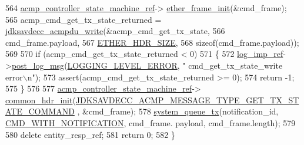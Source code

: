 \begin{DoxyCode}
564     \hyperlink{namespaceavdecc__lib_a693c2049de1d4ec860a92126b846ac21}{acmp\_controller\_state\_machine\_ref}->
      \hyperlink{classavdecc__lib_1_1acmp__controller__state__machine_a0a43868a3e99a6cef740e4562d006345}{ether\_frame\_init}(&cmd\_frame);
565     acmp\_cmd\_get\_tx\_state\_returned = \hyperlink{group__acmpdu_ga8cf8b61ba149419878384da1540d9673}{jdksavdecc\_acmpdu\_write}(&acmp\_cmd\_get\_tx\_state,
566                                                              cmd\_frame.payload,
567                                                              \hyperlink{namespaceavdecc__lib_a6c827b1a0d973e18119c5e3da518e65ca9512ad9b34302ba7048d88197e0a2dc0}{ETHER\_HDR\_SIZE},
568                                                              \textcolor{keyword}{sizeof}(cmd\_frame.payload));
569 
570     \textcolor{keywordflow}{if} (acmp\_cmd\_get\_tx\_state\_returned < 0)
571     \{
572         \hyperlink{namespaceavdecc__lib_acbe3e2a96ae6524943ca532c87a28529}{log\_imp\_ref}->\hyperlink{classavdecc__lib_1_1log_a68139a6297697e4ccebf36ccfd02e44a}{post\_log\_msg}(\hyperlink{namespaceavdecc__lib_a501055c431e6872ef46f252ad13f85cdaf2c4481208273451a6f5c7bb9770ec8a}{LOGGING\_LEVEL\_ERROR}, \textcolor{stringliteral}{"
      cmd\_get\_tx\_state\_write error\(\backslash\)n"});
573         assert(acmp\_cmd\_get\_tx\_state\_returned >= 0);
574         \textcolor{keywordflow}{return} -1;
575     \}
576 
577     \hyperlink{namespaceavdecc__lib_a693c2049de1d4ec860a92126b846ac21}{acmp\_controller\_state\_machine\_ref}->
      \hyperlink{classavdecc__lib_1_1acmp__controller__state__machine_ae93a117baf9620a7311f950271610506}{common\_hdr\_init}(\hyperlink{group__acmp__message__type_gae111bf6de86b42a7dd6c8de3128a1eb9}{JDKSAVDECC\_ACMP\_MESSAGE\_TYPE\_GET\_TX\_STATE\_COMMAND}
      , &cmd\_frame);
578     \hyperlink{namespaceavdecc__lib_a6dd511685627c0865a3442b539a4e8e9}{system\_queue\_tx}(notification\_id, \hyperlink{namespaceavdecc__lib_aabcadff06aa62be0ce47bc0646823604aba48b8a017e06fb240b650cdea965178}{CMD\_WITH\_NOTIFICATION}, cmd\_frame.
      payload, cmd\_frame.length);
579 
580     \textcolor{keyword}{delete} entity\_resp\_ref;
581     \textcolor{keywordflow}{return} 0;
582 \}
\end{DoxyCode}


